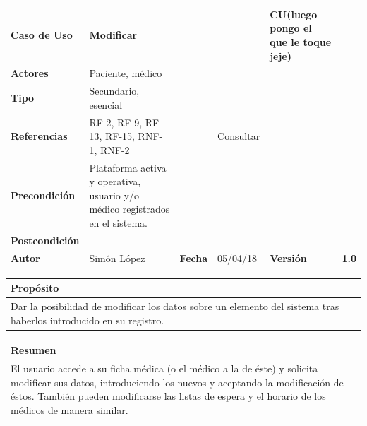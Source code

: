 \documentclass[11pt,a4paper]{article}
\begin{document}
\begin{table}[H]
	\centering
	\begin{tabular}{|l|lllll}
		\cline{1-1} \cline{6-6}
		\textbf{Caso de Uso}   & \textbf{Modificar} &   &  & \multicolumn{1}{l|}{\textbf{\textbf{CU(luego pongo el que le toque jeje)}}}        & \multicolumn{1}{l|}{\textbf{}} \\ \cline{1-1} \cline{6-6} 
		\textbf{Actores}       & Paciente, médico  &                                     &                       &                                       & \textbf{}                      \\ \cline{1-1}
		\textbf{Tipo}          & Secundario, esencial  &                                     &                       &                                       & \textbf{}                      \\ \cline{1-1}
		\textbf{Referencias}   & RF-2, RF-9, RF-13, RF-15, RNF-1, RNF-2 &   & Consultar                       &                                       & \textbf{}                      \\ \cline{1-1}
		\textbf{Precondición}  & Plataforma activa y operativa, usuario y/o médico registrados en el sistema.                          &                      &                & \textbf{}                      \\ \cline{1-1}
		\textbf{Postcondición} & -                     &                                     &                       &                                       &                                \\ \cline{1-1} \cline{3-3} \cline{5-5}
		\textbf{Autor}         & \multicolumn{1}{l|}{Simón López} & \multicolumn{1}{l|}{\textbf{Fecha}} & \multicolumn{1}{l|}{05/04/18} & \multicolumn{1}{l|}{\textbf{Versión}} & \textbf{1.0}                      \\ \cline{1-1} \cline{3-3} \cline{5-5}
	\end{tabular}
\end{table}

\begin{table}[H]
	\centering
	\begin{tabular}{l}
		\hline
		\multicolumn{1}{|l|}{Propósito} \\ \hline
		Dar la posibilidad de modificar los datos sobre un elemento del sistema tras haberlos introducido en su registro.
	\end{tabular}
\end{table}

\begin{table}[H]
	\centering
	\begin{tabular}{l}
		\hline
		\multicolumn{1}{|l|}{Resumen} \\ \hline
		El usuario accede a su ficha médica (o el médico a la de éste) y solicita modificar sus datos, introduciendo los nuevos y aceptando la modificación de éstos. También pueden modificarse las listas de espera y el horario de los médicos de manera similar.
	\end{tabular}
\end{table}
\end{document}
